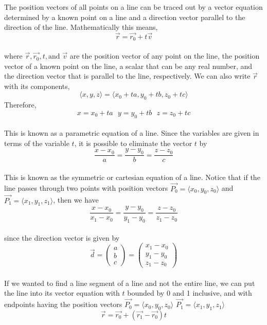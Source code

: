 \documentclass{article}
\begin{document}
	The position vectors of all points on a line can be traced out by a vector equation
	determined by a known point on a line and a direction vector parallel to the direction
	of the line. Mathematically this means, \\
	\[
		\vec{r}= \vec{r_0}+ t\vec{v}
	\]
	\\ where $\vec{r}, \vec{r_0}, t, \text{and}$ $\vec{v}$ are the position vector
	of any point on the line, the position vector of a known point on the line, a scalar
	that can be any real number, and the direction vector that is parallel to the
	line, respectively. We can also write $\vec{r}$ with its components,
	\[
		\langle x,y,z \rangle =\langle x_{0}+ta,y_{0}+tb,z_{0}+tc \rangle
	\]
	Therefore, \\
	\[
		x=x_{0}+ta \ \ \ y=y_{0}+tb \ \ \ z=z_{0}+tc
	\]
	\\ This is known as a parametric equation of a line. Since the variables are given
	in terms of the variable $t$, it is possible to eliminate the vector $t$ by \\
	\[
		\frac{x-x_{0}}{a}= \frac{y-y_{0}}{b}= \frac{z-z_{0}}{c}
	\]
	\\ This is known as the symmetric or cartesian equation of a line. Notice that
	if the line passes through two points with position vectors $\vec{P_0}= \langle
	x_{0},y_{0},z_{0} \rangle$ and $\vec{P_1}= \langle x_{1},y_{1},z_{1} \rangle$,
	then we have \\
	\[
		\frac{x-x_{0}}{x_{1}-x_{0}}= \frac{y-y_{0}}{y_{1}-y_{0}}= \frac{z-z_{0}}{z_{1}-z_{0}}
	\]
	\\ since the direction vector is given by \\
	\[
		\vec{d}=
		\begin{pmatrix}
			a \\
			b \\
			c
		\end{pmatrix}
		=
		\begin{pmatrix}
			x_{1}-x_{0} \\
			y_{1}-y_{0} \\
			z_{1}-z_{0}
		\end{pmatrix}
	\]
	\\ If we wanted to find a line segment of a line and not the entire line, we can
	put the line into its vector equation with $t$ bounded by 0 and 1 inclusive,
	and with endpoints having the position vectors
	$\vec{P_0}= \langle x_{0},y_{0},z_{0} \rangle$ 
	$\vec{P_1}= \langle x_{1},y_{1},z_{1} \rangle$ \\
	\[
		\vec{r}= \vec{r_0}+ (\vec{r_1}-\vec{r_0})t
	\]
\end{document}
